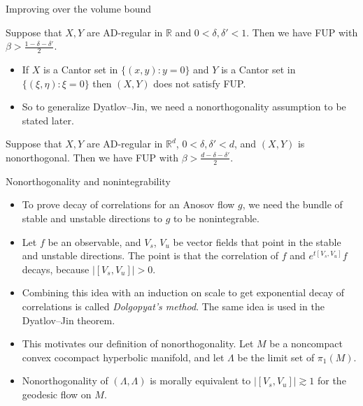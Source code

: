 \documentclass[10pt]{beamer}
\newcommand{\RR}{\mathbb{R}}
\begin{document}
\begin{frame}{Improving over the volume bound}
\begin{theorem}
Suppose that $X, Y$ are AD-regular in $\RR$ and $0 < \delta, \delta' < 1$. Then we have FUP with $\beta > \frac{1 - \delta - \delta'}{2}$.
\end{theorem} \pause

\begin{itemize}
\item If $X$ is a Cantor set in $\{(x, y): y = 0\}$ and $Y$ is a Cantor set in $\{(\xi, \eta): \xi = 0\}$ then $(X, Y)$ does not satisfy FUP. \pause
\item So to generalize Dyatlov--Jin, we need a nonorthogonality assumption to be stated later. \pause
\end{itemize}

\begin{theorem}
Suppose that $X, Y$ are AD-regular in $\RR^d$, $0 < \delta, \delta' < d$, and $(X, Y)$ is nonorthogonal. Then we have FUP with $\beta > \frac{d - \delta - \delta'}{2}$.
\end{theorem}
\end{frame}

\begin{frame}{Nonorthogonality and nonintegrability}
\begin{itemize}
\item To prove decay of correlations for an Anosov flow $g$, we need the bundle of stable and unstable directions to $g$ to be nonintegrable. \pause
\item Let $f$ be an observable, and $V_s$, $V_u$ be vector fields that point in the stable and unstable directions. The point is that the correlation of $f$ and $e^{t[V_s, V_u]} f$ decays, because $|[V_s, V_u]| > 0$. \pause
\item Combining this idea with an induction on scale to get exponential decay of correlations is called \emph{Dolgopyat's method}. The same idea is used in the Dyatlov--Jin theorem. \pause
\item This motivates our definition of nonorthogonality. Let $M$ be a noncompact convex cocompact hyperbolic manifold, and let $\Lambda$ be the limit set of $\pi_1(M)$. \pause
\item Nonorthogonality of $(\Lambda, \Lambda)$ is morally equivalent to $|[V_s, V_u]| \gtrsim 1$ for the geodesic flow on $M$.
\end{itemize}
\end{frame}
\end{document}
